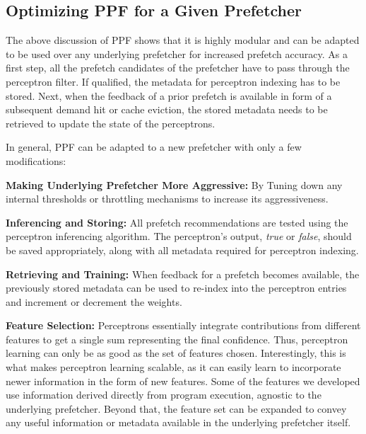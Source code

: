 \subsection{Optimizing PPF for a Given Prefetcher}
\label{Arch-Generalizing}
The above discussion of PPF shows that it is highly modular and can be
adapted to be used over any {\color{red}underlying} prefetcher for increased prefetch
accuracy. As a first step, all the prefetch
candidates of the prefetcher have to pass through the perceptron filter. 
If qualified, the metadata for perceptron indexing has to be stored. 
Next, when the feedback of a prior prefetch is available in form
of a subsequent demand hit or cache eviction, the stored
metadata needs to be retrieved to update the state of the perceptrons.


In general, PPF can be adapted to a {\color{red}new prefetcher} with only a
few modifications:

\noindent \textbf{Making {\color{red}Underlying} Prefetcher More Aggressive:} By Tuning 
down any internal thresholds or throttling mechanisms to increase its
aggressiveness.

\noindent \textbf{Inferencing and Storing:} All prefetch
recommendations are tested using the perceptron inferencing algorithm.
The perceptron's output, \textit{true} or \textit{false}, should be
saved appropriately, along with all metadata required for perceptron
indexing.

\noindent \textbf{Retrieving and Training:} When feedback for a
prefetch becomes available, the previously stored metadata can be used
to re-index into the perceptron entries and increment or decrement the
weights.

\noindent \textbf{Feature Selection:} Perceptrons essentially
integrate contributions from different features to get a single sum
representing the final confidence.  Thus, perceptron learning can only
be as good as the set of features chosen.  Interestingly, this is what
makes perceptron learning scalable, as it can easily learn to
incorporate newer information in the form of new features.  Some of
the features we developed use information derived directly from
program execution, agnostic to the {\color{red}underlying} prefetcher.  Beyond that,
the feature set can be expanded to convey any useful information or
metadata available in the {\color{red}underlying} prefetcher itself.

